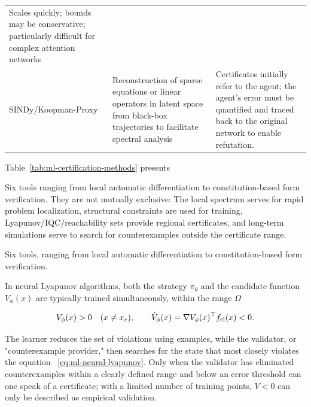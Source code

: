 \documentclass[11pt,a4paper,openany]{book}
\numberwithin{equation}{chapter}
\numberwithin{figure}{chapter}
\numberwithin{table}{chapter}
\newcommand{\tabletext}[2]{%
  \par\smallskip\noindent
  Table~\ref{#1} presents #2
\par\smallskip
}
\begin{document}
\begin{center}
\begin{tabular}{p{3.0cm}p{5.0cm}p{6.1cm}}
Scales quickly; bounds may be conservative; particularly difficult for complex attention networks





\\







SINDy/Koopman-Proxy




&






Reconstruction of sparse equations or linear operators in latent space from black-box trajectories to facilitate spectral analysis
&Certificates initially refer to the agent; the agent's error must be quantified and traced back to the original network to enable refutation.

\\
\bottomrule
\end{tabular}
\end{center}
\tabletext{tab:ml-certification-methods}{

Six tools ranging from local automatic differentiation to constitution-based form verification. They are not mutually exclusive: The local spectrum serves for rapid problem localization, structural constraints are used for training, Lyapunov/IQC/reachability sets provide regional certificates, and long-term simulations serve to search for counterexamples outside the certificate range.


Six tools, ranging from local automatic differentiation to constitution-based form verification. }

In neural Lyapunov algorithms, both the strategy $\pi_\theta$ and the candidate function $V_\phi(x)$ are typically trained simultaneously, within the range $\Omega$

\begin{equation}
V_\phi(x)>0\quad(x\ne x_e),\qquad
\dot V_\phi(x)=\nabla V_\phi(x)^\top f_{\rm cl}(x)<0.
\label{eq:ml-neural-lyapunov}
\end{equation}

The learner reduces the set of violations using examples, while the validator, or "counterexample provider," then searches for the state that most closely violates the equation ~\eqref{eq:ml-neural-lyapunov}. Only when the validator has eliminated counterexamples within a clearly defined range and below an error threshold can one speak of a certificate; with a limited number of training points, $\dot V<0$ can only be described as empirical validation.
\end{document}
